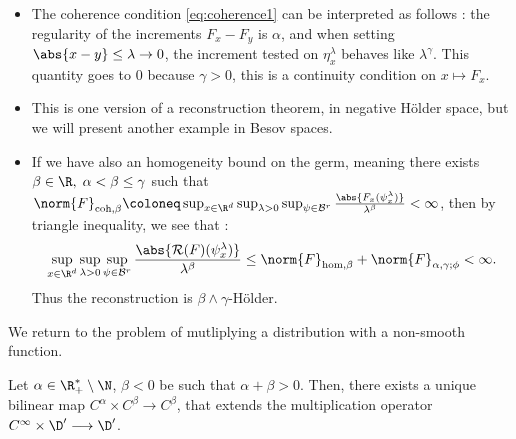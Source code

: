 \begin{remark}
    \begin{itemize}
        \item The coherence condition \eqref{eq:coherence1} can be interpreted as follows : the regularity of the increments $F_x - F_y$ is $\alpha$, and when setting $\abs{x-y}\leq \lambda \rightarrow 0$, the increment tested on $\eta^\lambda_x$ behaves like $\lambda^\gamma$. This quantity goes to $0$ because $\gamma >0$, this is a continuity condition on $x \mapsto F_x$.
        \item This is one version of a reconstruction theorem, in negative Hölder space, but we will present another example in Besov spaces.
        \item If we have also an homogeneity bound on the germ, meaning there exists $\beta \in \R, \; \alpha<\beta\leq\gamma$ such that $\norm{F}_{\text{coh,}\beta}\coloneq \sup_{x\in \R^d} \sup_{\lambda > 0} \sup_{\psi \in \mathcal{B}^r} \frac{\abs{F_x(\psi_x^\lambda)}}{\lambda^\beta} < \infty$, then by triangle inequality, we see that :
        \begin{equation*}
            \sup_{x\in \R^d} \sup_{\lambda > 0} \sup_{\psi \in \mathcal{B}^r} \frac{\abs{\mathcal{R}(F)(\psi_x^\lambda)}}{\lambda^\beta} \leq \norm{F}_{\text{hom,}\beta} + \norm{F}_{\alpha,\gamma;\phi} < \infty.
        \end{equation*}
        Thus the reconstruction is $\beta \wedge \gamma$-Hölder.
    \end{itemize}
\end{remark}

We return to the problem of mutliplying a distribution with a non-smooth function.
\begin{corollary}
    Let $\alpha \in \R^*_+\setminus\N$, $\beta <0$ be such that $\alpha+\beta>0$. 
    Then, there exists a unique bilinear map $C^\alpha \times C^\beta \longrightarrow C^\beta$, that extends the multiplication operator $C^\infty \times \D' \longrightarrow \D'$.
\end{corollary}

